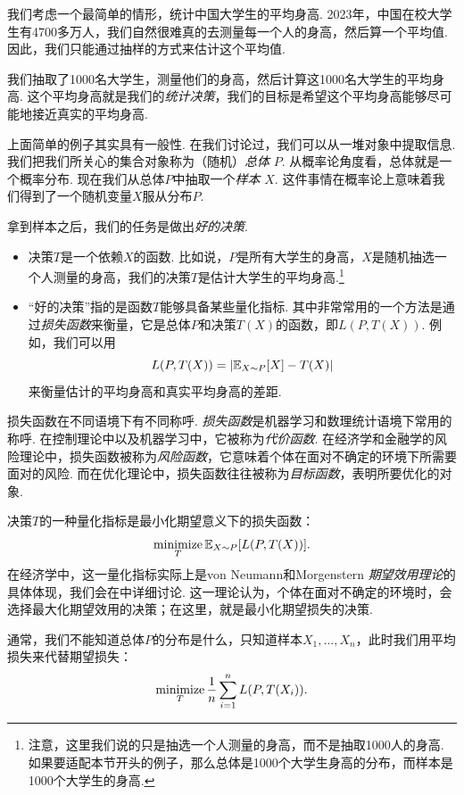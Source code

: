 我们考虑一个最简单的情形，统计中国大学生的平均身高. 2023年，中国在校大学生有4700多万人，我们自然很难真的去测量每一个人的身高，然后算一个平均值. 因此，我们只能通过抽样的方式来估计这个平均值. 

我们抽取了1000名大学生，测量他们的身高，然后计算这1000名大学生的平均身高. 这个平均身高就是我们的\textit{统计决策}，我们的目标是希望这个平均身高能够尽可能地接近真实的平均身高. 

上面简单的例子其实具有一般性. 在我们讨论过，我们可以从一堆对象中提取信息. 我们把我们所关心的集合对象称为（随机）\textit{总体} $P$. 从概率论角度看，总体就是一个概率分布. 现在我们从总体$P$中抽取一个\textit{样本} $X$. 这件事情在概率论上意味着我们得到了一个随机变量$X$服从分布$P$. 

拿到样本之后，我们的任务是做出\textit{好的决策}.
\begin{itemize}
    \item 决策$T$是一个依赖$X$的函数. 比如说，$P$是所有大学生的身高，$X$是随机抽选一个人测量的身高，我们的决策$T$是估计大学生的平均身高.\footnote{注意，这里我们说的只是抽选一个人测量的身高，而不是抽取1000人的身高. 如果要适配本节开头的例子，那么总体是1000个大学生身高的分布，而样本是1000个大学生的身高. }
    \item “好的决策”指的是函数$T$能够具备某些量化指标. 其中非常常用的一个方法是通过\textit{损失函数}来衡量，它是总体$P$和决策$T(X)$的函数，即$L(P,T(X))$. 例如，我们可以用
    \[L(P,T(X))=|\mathbb{E}_{X\sim P}[X]-T(X)|\]
    来衡量估计的平均身高和真实平均身高的差距.
\end{itemize}

\begin{remark}
    损失函数在不同语境下有不同称呼. \textit{损失函数}是机器学习和数理统计语境下常用的称呼. 在控制理论中以及机器学习中，它被称为\textit{代价函数}. 在经济学和金融学的风险理论中，损失函数被称为\textit{风险函数}，它意味着个体在面对不确定的环境下所需要面对的风险. 而在优化理论中，损失函数往往被称为\textit{目标函数}，表明所要优化的对象. 
\end{remark}

决策$T$的一种量化指标是最小化期望意义下的损失函数：
    \[\operatorname*{minimize}_{T}\mathbb{E}_{X\sim P}[L(P,T(X))].\]
在经济学中，这一量化指标实际上是von Neumann和Morgenstern \textit{期望效用理论}的具体体现，我们会在中详细讨论. 这一理论认为，个体在面对不确定的环境时，会选择最大化期望效用的决策；在这里，就是最小化期望损失的决策.

通常，我们不能知道总体$P$的分布是什么，只知道样本$X_1,\dots,X_n$，此时我们用平均损失来代替期望损失：
    \[\operatorname*{minimize}_{T}\frac{1}{n}\sum_{i=1}^n L(P,T(X_i)).\]

